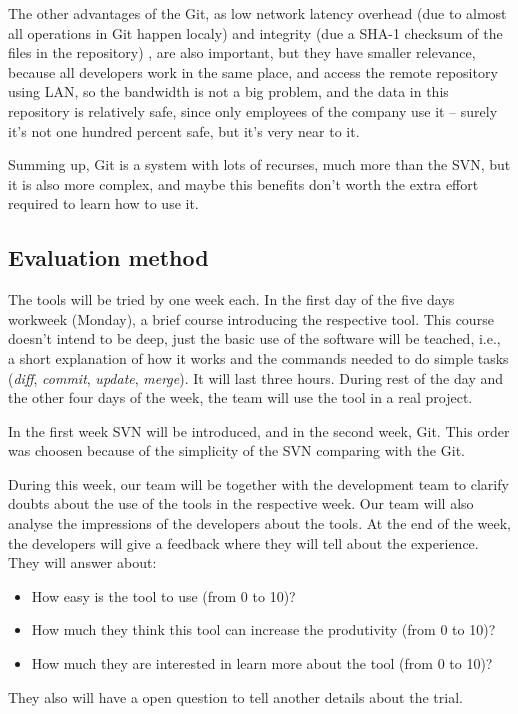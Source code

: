 \documentclass[a4paper]{article}
\begin{document}
The other advantages of the Git, as low network latency overhead (due to almost all operations in Git happen localy) and integrity (due a SHA-1 checksum of the files in the repository) \cite{chacon}, are also important, but they have smaller relevance, because all developers work in the same place, and access the remote repository using LAN, so the bandwidth is not a big problem, and the data in this repository is relatively safe, since only employees of the company use it -- surely it's not one hundred percent safe, but it's very near to it.

Summing up, Git is a system with lots of recurses, much more than the SVN, but it is also more complex, and maybe this benefits don't worth the extra effort required to learn how to use it.

\subsection{Evaluation method}

The tools will be tried by one week each. 
In the first day of the five days workweek (Monday), a brief course introducing the respective tool.
This course doesn't intend to be deep, just the basic use of the software will be teached, i.e., a short explanation of how it works and the commands needed to do simple tasks (\emph{diff}, \emph{commit}, \emph{update}, \emph{merge}).
It will last three hours.
During rest of the day and the other four days of the week, the team will use the tool in a real project.

In the first week SVN will be introduced, and in the second week, Git.
This order was choosen because of the simplicity of the SVN comparing with the Git.

During this week, our team will be together with the development team to clarify doubts about the use of the tools in the respective week. 
Our team will also analyse the impressions of the developers about the tools.
At the end of the week, the developers will give a feedback where they will tell about the experience. 
They will answer about:
\begin{itemize}
\item How easy is the tool to use (from 0 to 10)?
\item How much they think this tool can increase the produtivity (from 0 to 10)?
\item How much they are interested in learn more about the tool (from 0 to 10)?
\end{itemize}
They also will have a open question to tell another details about the trial.
\end{document}
